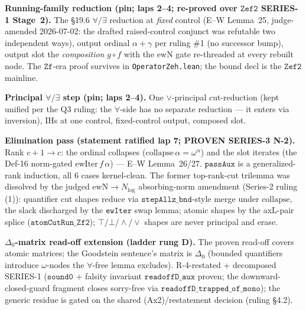 \begin{theorem}\label{thm:zeh_reduction}
  \leanok
\textbf{Running-family reduction (pin; laps 2--4; re-proved over \(\mathtt{Zef2}\) SERIES-1
Stage~2).}  The \S19.6 \(\forall/\exists\) reduction at \emph{fixed} control (E--W Lemma~25,
judge-amended 2026-07-02: the drafted raised-control conjunct was refutable two independent ways),
output ordinal \(\alpha+\gamma\) per ruling \#1 (no successor bump), output slot the
\emph{composition} \(g\circ f\) with the \(\mathrm{ewN}\) gate re-threaded at every rebuilt node.
The \(\mathtt{Zf}\)-era proof survives in \texttt{OperatorZeh.lean}; the bound decl is the
\(\mathtt{Zef2}\) mainline.
\end{theorem}

\begin{theorem}\label{thm:zeh_step}
  \leanok
\textbf{Principal \(\forall/\exists\) step (pin; laps 2--4).}  One \(\vee\)-principal
cut-reduction (kept unified per the Q3 ruling: the \(\forall\)-side has no separate reduction ---
it enters via inversion), IHs at one control, fixed-control output, composed slot.
\end{theorem}

\begin{theorem}\label{thm:zeh_pass}
  \leanok
\textbf{Elimination pass (statement ratified lap 7; PROVEN SERIES-3 N-2).}
Rank \(c+1 \to c\): the ordinal collapses (\(\mathrm{collapse}\,\alpha = \omega^\alpha\)) and the
slot iterates (the Def-16 norm-gated \(\mathrm{ewIter}\,f\,\alpha\)) --- E--W Lemma~26/27.
\(\texttt{passAux}\) is a generalized-rank induction, all 6 cases kernel-clean.  The former
top-rank-cut trilemma was dissolved by the judged \(\mathrm{ewN}\to N_{\log}\) absorbing-norm
amendment (Series-2 ruling (1)): quantifier cut shapes reduce via
\(\texttt{stepAllz\_bnd}\)-style merge under \(\mathrm{collapse}\), the slack discharged by the
\(\texttt{ewIter}\) swap lemma; atomic shapes by the axL-pair splice
(\(\texttt{atomCutRun\_Zf2}\)); \(\top/\bot/\wedge/\vee\) shapes are never principal and erase.
\end{theorem}

\begin{theorem}\label{thm:zeh_readoff_delta0}
  \notready
\textbf{\(\Delta_0\)-matrix read-off extension (ladder rung D).}  The proven read-off covers atomic
matrices; the Goodstein sentence's matrix is \(\Delta_0\) (bounded quantifiers introduce
\(\omega\)-nodes the \(\forall\)-free lemma excludes).  R-4-restated + decomposed SERIES-1
(\(\texttt{sound0}\) + falsity invariant \(\texttt{readoffD\_aux}\) proven; the downward-closed-guard
fragment closes sorry-free via \(\texttt{readoffD\_trapped\_of\_mono}\)); the generic residue is
gated on the shared (Ax2)/restatement decision (ruling \S4.2).
\end{theorem}

